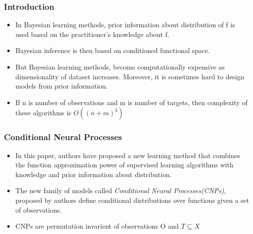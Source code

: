 \documentclass{beamer}
\begin{document}
\begin{frame}
\frametitle{Introduction}
\begin{itemize}
\item In Bayesian learning methods, prior information about distribution of f is used based on the practitioner's knowledge about f.
\item Bayesian inference is then based on conditioned functional space.
\item But Bayesian learning methods, become computationally expensive as dimensionality of dataset increases. Moreover, it is sometimes hard to design models from prior information.
\item If n is number of observations and m is number of targets, then complexity of these algorithms is $O((n+m)^3)$
\end{itemize}
  

\end{frame}
\begin{frame}
\frametitle{Conditional Neural Processes}

\begin{itemize}
\item In this paper, authors have proposed a new learning method that combines the function approximation power of supervised learning algorithms with knowledge and prior information about distribution.
\item The new family of models called \textit{Conditional Neural Processes(CNPs)}, proposed by authors define conditional distributions over functions given a set of observations.
\item CNPs are permutation invarient of observations O and $T\subseteq X$
\end{itemize}

\end{frame}
\end{document}
